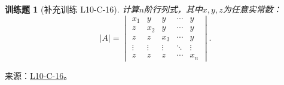 \documentclass[UTF8,12pt,a4paper,fontset=fandol]{ctexart}
\newtheorem{exercise}{训练题}[section]
\begin{document}
\begin{exercise}[补充训练 L10-C-16]\label{prob:L10-C-16}
计算$n$阶行列式，其中$x,y,z$为任意实常数：
        \[|A|=\begin{vmatrix}
                x_1    & y      & y      & \cdots & y      \\
                z      & x_2    & y      & \cdots & y      \\
                z      & z      & x_3    & \cdots & y      \\
                \vdots & \vdots & \vdots & \ddots & \vdots \\
                z      & z      & z      & \cdots & x_n
            \end{vmatrix}.\]
\end{exercise}
\noindent 来源：\href{https://github.com/yhwu-is/Linear-Algebra-Left-Undone/blob/new/%E8%AE%B2%E4%B9%89/%E4%B8%93%E9%A2%98/10%20%E8%A1%8C%E5%88%97%E5%BC%8F.tex}{L10-C-16}。
\end{document}
